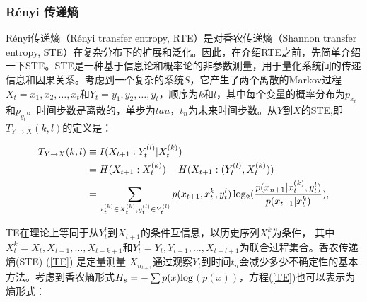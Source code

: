 \subsubsection{R\'enyi 传递熵}
R\'enyi传递熵（R\'enyi transfer entropy, RTE）是对香农传递熵（Shannon transfer entropy, STE）在复杂分布下的扩展和泛化。因此，在介绍RTE之前，先简单介绍一下STE。STE是一种基于信息论和概率论的非参数测量，用于量化系统间的传递信息和因果关系。考虑到一个复杂的系统$S$，它产生了两个离散的Markov过程$X_{t}=x_{1}, x_{2}, \ldots, x_{t}$和$Y_{t}=y_{1}, y_{2}, \ldots, y_{t}$，顺序为$k$和$l$，其中每个变量的概率分布为$p_{x_{t}}$和$p_{y_{t}}$。时间步数是离散的，单步为$tau$，$t_{n}$为未来时间步数。从$Y$到$X$的STE,即 $T_{Y\rightarrow X}(k,l)$的定义是：

\begin{align}\label{TE}
T_{Y\rightarrow X}(k,l) &\equiv I(X_{t+1}:Y_{t}^{(l)}|X_{t}^{(k)}) \notag\\
&= H(X_{t+1}:X_{t}^{(k)}) - H(X_{t+1}:(Y_{t}^{(l)}, X_{t}^{(k)})) \notag\\
&=\sum\limits_{x_{t}^{(k)} \in X_{t}^{(k)}, y_{t}^{(l)} \in Y_{t}^{(l)}} p(x_{t+1}, x_{t}^{k}, y_{t}^{l}) \log_{2}(\frac{p(x_{n+1}|x_{t}^{(k)},y_{t}^{l})}{p(x_{t+1}|x_{t}^{k})}),
\end{align}

TE在理论上等同于从$Y_{t}^{l}$到$X_{t+1}$的条件互信息，以历史序列$X_{t}^{k}$为条件， 其中$X_{t}^{k}={X_{t}, X_{t-1}, \ldots, X_{t-k+1}}$和$Y_{t}^{l}={Y_{t}, Y_{t-1}, \ldots, X_{t-l+1}}$为联合过程集合。香农传递熵(STE) (\ref{TE}) 是定量测量 $X_{n_{t+1}}$通过观察$Y_{t}$到时间$t_{n}$会减少多少不确定性的基本方法。考虑到香农熵形式$H_{s}=-\sum p(x)\rm{log}$$(p(x))$，方程(\ref{TE})也可以表示为熵形式：

